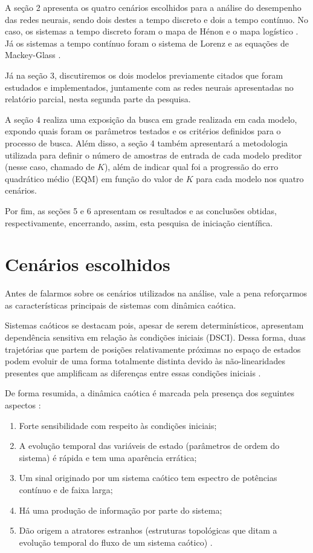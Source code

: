 \documentclass[a4paper, 12pt]{article}
\begin{document}
A seção 2 apresenta os quatro cenários escolhidos para a análise do desempenho das redes neurais, sendo dois destes a tempo discreto e dois a tempo contínuo. No caso, os sistemas a tempo discreto foram o mapa de Hénon \cite{henon1976two} e o mapa logístico \cite{may1976simple}. Já os sistemas a tempo contínuo foram o sistema de Lorenz \cite{lorenz1963deterministic} e as equações de Mackey-Glass \cite{mackey1977oscillation}.

Já na seção 3, discutiremos os dois modelos previamente citados que foram estudados e implementados, juntamente com as redes neurais apresentadas no relatório parcial, nesta segunda parte da pesquisa. 

A seção 4 realiza uma exposição da busca em grade \cite{geron2019hands} realizada em cada modelo, expondo quais foram os parâmetros testados e os critérios definidos para o processo de busca. Além disso, a seção 4 também apresentará a metodologia utilizada para definir o número de amostras de entrada de cada modelo preditor (nesse caso, chamado de $K$), além de indicar qual foi a progressão do erro quadrático médio (EQM) em função do valor de $K$ para cada modelo nos quatro cenários.

Por fim, as seções 5 e 6 apresentam os resultados e as conclusões obtidas, respectivamente, encerrando, assim, esta pesquisa de iniciação científica.
 
\section{Cenários escolhidos}

Antes de falarmos sobre os cenários utilizados na análise, vale a pena reforçarmos as características principais de sistemas com dinâmica caótica. 

Sistemas caóticos se destacam pois, apesar de serem determinísticos, apresentam dependência sensitiva em relação às condições iniciais (DSCI). Dessa forma, duas trajetórias que partem de posições relativamente próximas no espaço de estados podem evoluir de uma forma totalmente distinta devido às não-linearidades presentes que amplificam as diferenças entre essas condições iniciais \cite{fiedler1994caos}.

De forma resumida, a dinâmica caótica é marcada pela presença dos seguintes aspectos \cite{attux2001dinamica}:
\begin{enumerate}
\item Forte sensibilidade com respeito às condições iniciais;
\item A evolução temporal das variáveis de estado (parâmetros de ordem do sistema) é rápida e tem uma aparência errática;
\item Um sinal originado por um sistema caótico tem espectro de potências contínuo e de faixa larga;
\item Há uma produção de informação por parte do sistema;
\item Dão origem a atratores estranhos (estruturas topológicas que ditam a evolução temporal do fluxo de um sistema caótico) \cite{ruelle1971nature}.
\end{enumerate}
\end{document}

